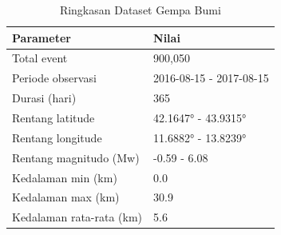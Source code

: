 \begin{table}
\caption{Ringkasan Dataset Gempa Bumi}
\label{tab:dataset_overview}
\begin{tabular}{|l|l|}
\toprule
Parameter & Nilai \\
\midrule
Total event & 900,050 \\
Periode observasi & 2016-08-15 - 2017-08-15 \\
Durasi (hari) & 365 \\
Rentang latitude & 42.1647° - 43.9315° \\
Rentang longitude & 11.6882° - 13.8239° \\
Rentang magnitudo (Mw) & -0.59 - 6.08 \\
Kedalaman min (km) & 0.0 \\
Kedalaman max (km) & 30.9 \\
Kedalaman rata-rata (km) & 5.6 \\
\bottomrule
\end{tabular}
\end{table}
